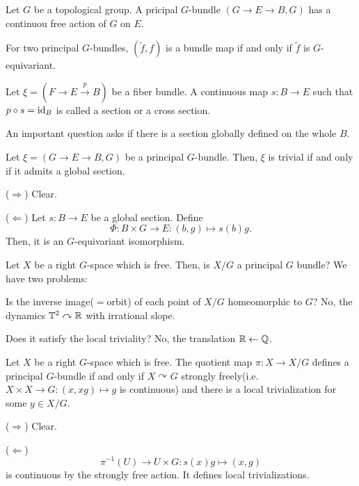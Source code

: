 \documentclass{../../../small}
\begin{document}
Let $G$ be a topological group.
A pricipal $G$-bundle $(G\to E\to B,G)$ has a continuou free action of $G$ on $E$.

\begin{rmk*}
For two principal $G$-bundles, $(\tilde f,f)$ is a bundle map if and only if $\tilde f$ is $G$-equivariant.
\end{rmk*}

\begin{defn}
Let $\xi=(F\to E\xrightarrow{p}B)$ be a fiber bundle.
A continuous map $s:B\to E$ such that $p\circ s=\operatorname{id}_B$ is called a section or a cross section.

An important question asks if there is a section globally defined on the whole $B$.
\end{defn}

\begin{prop}
Let $\xi=(G\to E\to B,G)$ be a principal $G$-bundle.
Then, $\xi$ is trivial if and only if it admits a global section.
\end{prop}

\begin{pf}
($\Rightarrow$)
Clear.

($\Leftarrow$)
Let $s:B\to E$ be a global section.
Define
\[\Phi:B\times G\to E:(b,g)\mapsto s(b)g.\]
Then, it is an $G$-equivariant isomorphism.
\end{pf}


Let $X$ be a right $G$-space which is free.
Then, is $X/G$ a principal $G$ bundle?
We have two problems:
\begin{parts}
\item Is the inverse image($=$orbit) of each point of $X/G$ homeomorphic to $G$?
No, the dynamics $\mathbb{T}^2\curvearrowright\mathbb{R}$ with irrational slope.
\item Does it satisfy the local triviality?
No, the translation $\mathbb{R}\leftarrow\mathbb{Q}$.
\end{parts}

\begin{prop}
Let $X$ be a right $G$-space which is free.
The quotient map $\pi:X\to X/G$ defines a principal $G$-bundle if and only if $X\curvearrowright G$ strongly freely(i.e. $X\times X\to G:(x,xg)\mapsto g$ is continuous) and there is a local trivialization for some $y\in X/G$.
\end{prop}
\begin{pf}
($\Rightarrow$) Clear.

($\Leftarrow$)
\[\pi^{-1}(U)\to U\times G:s(x)g\mapsto(x,g)\]
is continuous by the strongly free action.
It defines local trivializations.
\end{pf}
\end{document}
